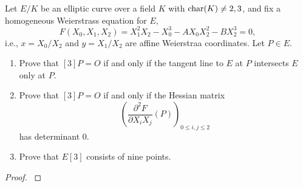 \documentclass[12pt,reqno]{amsart}
\begin{document}
\begin{exe}\label{3.9}
Let $E/K$ be an elliptic curve over a field $K$ with ${\operatorname{char}}(K)\neq 2, 3$, and fix a homogeneous Weierstrass equation for $E$,
\[
F(X_0, X_1, X_2)=X_1^2X_2-X_0^3-AX_0X_2^2-BX_2^3=0,
\]
i.e., $x=X_0/X_2$ and $y=X_1/X_2$ are affine Weierstraa coordinates.  Let $P\in E$.
\begin{enumerate}
\item
Prove that $[3]P=O$ if and only if the tangent line to $E$ at $P$ intersects $E$ only at $P$.
\item
Prove that $[3]P=O$ if and only if the Hessian matrix
\[
\left(\frac{\partial^2 F}{\partial X_iX_j}(P)\right)_{0\leq i, j \leq 2}
\]
has determinant $0$.

\item
Prove that $E[3]$ consists of nine points.
\end{enumerate}
\begin{proof}\label{s3.9}

\end{proof} 
\end{exe} 
\end{document}
